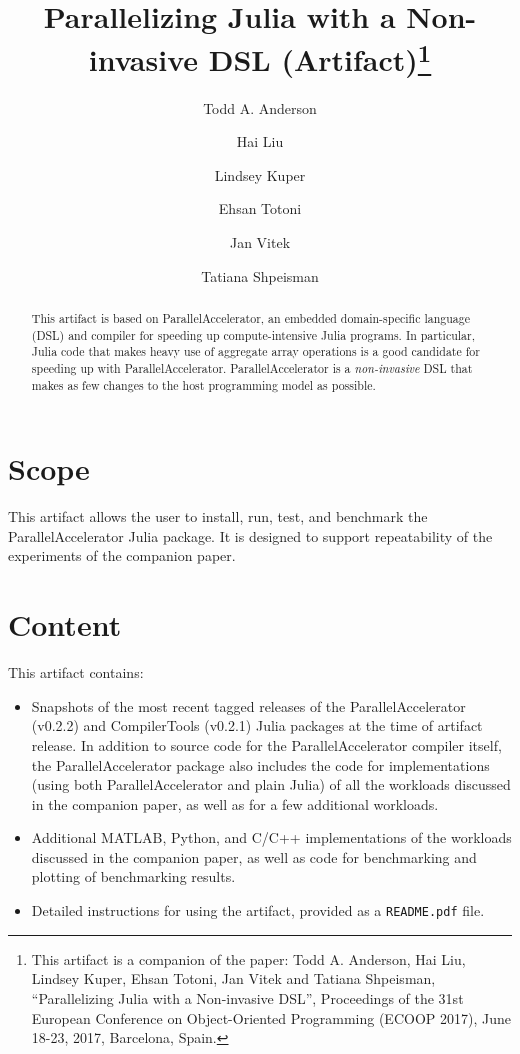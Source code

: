 \documentclass[letterpaper,USenglish]{darts}
\title{Parallelizing Julia with a Non-invasive DSL (Artifact)\footnote{This artifact is a companion of the paper:  Todd A. Anderson, Hai Liu, Lindsey Kuper, Ehsan Totoni, Jan Vitek and Tatiana Shpeisman, ``Parallelizing Julia with a Non-invasive DSL'', Proceedings of the 31st European Conference on Object-Oriented Programming (ECOOP 2017), June 18-23, 2017, Barcelona, Spain.}}
\author[1]{Todd A. Anderson}
\author[1]{Hai Liu}
\author[1]{Lindsey Kuper}
\author[1]{Ehsan Totoni}
\author[2]{Jan Vitek}
\author[1]{Tatiana Shpeisman}
\affil[1]{Parallel Computing Lab, Intel Labs}
\affil[2]{Northeastern University / Czech Technical University Prague}
\newenvironment{scope}{\section{Scope}}{}
\newenvironment{content}{\section{Content}}{}
\begin{document}
\maketitle

\begin{abstract}
  This artifact is based on ParallelAccelerator, an embedded
  domain-specific language (DSL) and compiler for speeding up
  compute-intensive Julia programs.  In particular, Julia code that
  makes heavy use of aggregate array operations is a good candidate
  for speeding up with ParallelAccelerator.  ParallelAccelerator is a
  \emph{non-invasive} DSL that makes as few changes to the host
  programming model as possible.
\end{abstract}


\begin{scope}
  This artifact allows the user to install, run, test, and benchmark
  the ParallelAccelerator Julia package.  It is designed to support
  repeatability of the experiments of the companion paper.
\end{scope}

\begin{content}
  This artifact contains:

  \begin{itemize}
    \item Snapshots of the most recent tagged releases of the
      ParallelAccelerator (v0.2.2) and CompilerTools (v0.2.1) Julia
      packages at the time of artifact release.  In addition to source
      code for the ParallelAccelerator compiler itself, the
      ParallelAccelerator package also includes the code for
      implementations (using both ParallelAccelerator and plain Julia)
      of all the workloads discussed in the companion paper, as well
      as for a few additional workloads.
    \item Additional MATLAB, Python, and C/C++ implementations of the
      workloads discussed in the companion paper, as well as code
      for benchmarking and plotting of benchmarking results.
    \item Detailed instructions for using the artifact, provided as a
      {\tt README.pdf} file.
  \end{itemize}
\end{content} 
\end{document}
